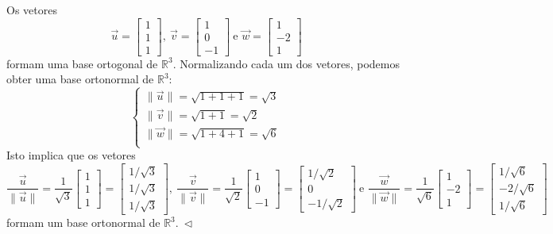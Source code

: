 \begin{ex}
	Os vetores
	\begin{equation}
	\vec{u} =
	\begin{bmatrix}
	1 \\ 1 \\ 1
	\end{bmatrix}, \
	\vec{v} =
	\begin{bmatrix}
	1 \\ 0 \\ -1
	\end{bmatrix} \ \text{e }
	\vec{w} =
	\begin{bmatrix}
	1 \\ -2 \\ 1
	\end{bmatrix}
	\end{equation} formam uma base ortogonal de $\mathbb{R}^3$. Normalizando cada um dos vetores, podemos obter uma base ortonormal de $\mathbb{R}^3$:
	\begin{equation}
	\left\{
	\begin{array}{ll}
	\|\vec{u}\| = \sqrt{1 + 1 + 1} = \sqrt{3} \\
	\|\vec{v}\| = \sqrt{1 + 1} = \sqrt{2} \\
	\|\vec{w}\| = \sqrt{1 + 4 + 1} = \sqrt{6} \\
	\end{array}
	\right.
	\end{equation} Isto implica que os vetores
	\begin{equation}
	\frac{\vec{u}}{\|\vec{u}\|} = \frac{1}{\sqrt{3}}
	\begin{bmatrix}
	1 \\ 1 \\ 1
	\end{bmatrix} =
	\begin{bmatrix}
	1/\sqrt{3} \\ 1/\sqrt{3} \\ 1/\sqrt{3}
	\end{bmatrix}, \
	\frac{\vec{v}}{\|\vec{v}\|} = \frac{1}{\sqrt{2}}
	\begin{bmatrix}
	1 \\ 0 \\ -1
	\end{bmatrix} =
	\begin{bmatrix}
	1/\sqrt{2} \\ 0 \\ -1/\sqrt{2}
	\end{bmatrix} \ \text{e }
	\frac{\vec{w}}{\|\vec{w}\|} = \frac{1}{\sqrt{6}}
	\begin{bmatrix}
	1 \\ -2 \\ 1
	\end{bmatrix} =
	\begin{bmatrix}
	1/\sqrt{6} \\ -2/\sqrt{6} \\ 1/\sqrt{6}
	\end{bmatrix}
	\end{equation} formam um base ortonormal de $\mathbb{R}^3. \ \lhd$
\end{ex}

